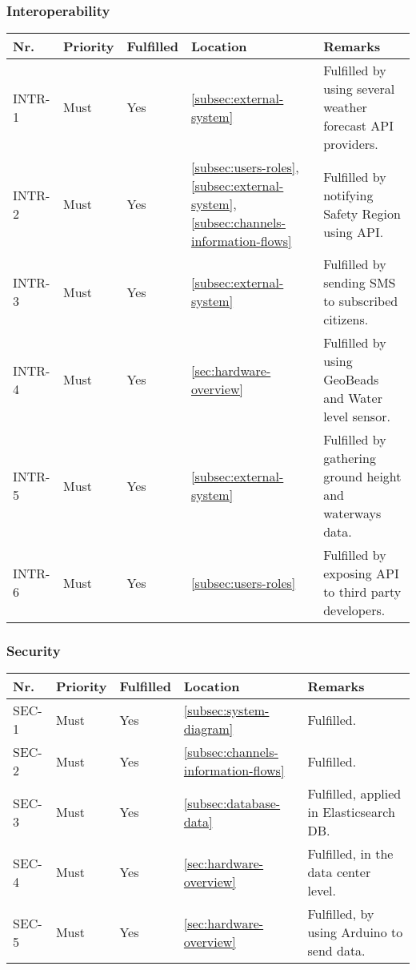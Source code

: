 \subsubsection{Interoperability}
\begin{table}[H]
	\begin{tabular}{lllll}
						    
		Nr.    & Priority & Fulfilled & Location & Remarks \\ \hline
		INTR-1 & Must     & Yes      &\ref{subsec:external-system} & Fulfilled by using several weather forecast API providers.       \\ 
		INTR-2 & Must     & Yes      &\ref{subsec:users-roles}, \ref{subsec:external-system}, \ref{subsec:channels-information-flows}& Fulfilled by notifying Safety Region using API.\\ 
		INTR-3 & Must     & Yes      &\ref{subsec:external-system} & Fulfilled by sending SMS to subscribed citizens. \\ 
		INTR-4 & Must     & Yes      & \ref{sec:hardware-overview} & Fulfilled by using GeoBeads and Water level sensor. \\ 
		INTR-5 & Must     & Yes      & \ref{subsec:external-system} & Fulfilled by gathering ground height and waterways data. \\ 
		INTR-6 & Must     & Yes      & \ref{subsec:users-roles} & Fulfilled by exposing API to third party developers.       \\ 
						
	\end{tabular}
\end{table}

\subsubsection{Security}
\begin{table}[H]
	\begin{tabular}{lllll}
						    
		Nr.   & Priority & Fulfilled & Location & Remarks \\ \hline
		SEC-1 & Must     & Yes      & \ref{subsec:system-diagram} & Fulfilled. \\ 
		SEC-2 & Must     & Yes      & \ref{subsec:channels-information-flows} & Fulfilled. \\ 
		SEC-3 & Must     & Yes      & \ref{subsec:database-data} & Fulfilled, applied in Elasticsearch DB. \\ 
		SEC-4 & Must     & Yes      & \ref{sec:hardware-overview} & Fulfilled, in the data center level. \\ 
		SEC-5 & Must     & Yes      & \ref{sec:hardware-overview} & Fulfilled, by using Arduino to send data.\\
						
	\end{tabular}
\end{table}

